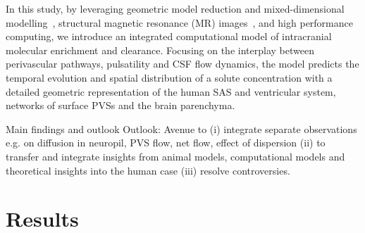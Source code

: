 \documentclass[fleqn,10pt]{wlscirep}
\newcommand{\mer}[1]{\textcolor{magenta}{#1}}
\begin{document}
In this study, by leveraging geometric model reduction and
mixed-dimensional modelling~\cite{masri2024modelling}, structural
magnetic resonance (MR) images~\cite{hodneland2019new}, and high
performance computing, we introduce an integrated computational model
of intracranial molecular enrichment and clearance. Focusing on the
interplay between perivascular pathways, pulsatility and CSF flow
dynamics, the model predicts the temporal evolution and spatial
distribution of a solute concentration with a detailed geometric
representation of the human SAS and ventricular system, networks of
surface PVSs and the brain
parenchyma. \textcolor{lightgray}{\lipsum[2]}


Main findings and outlook \textcolor{lightgray}{\lipsum[1]} Outlook:
  Avenue to (i) integrate separate observations e.g. on diffusion in
  neuropil, PVS flow, net flow, effect of dispersion (ii) to transfer
  and integrate insights from animal models, computational models and
  theoretical insights into the human case (iii) resolve
  controversies.


  


\section*{Results}
\end{document}
